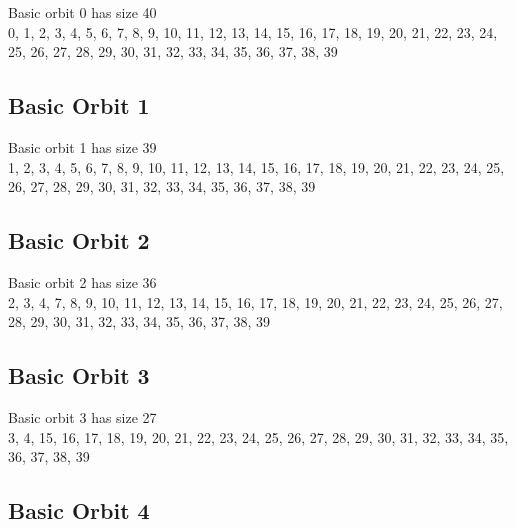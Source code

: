 \documentclass{article}
\begin{document}
{

Basic orbit 0 has size 40\\
0, 1, 2, 3, 4, 5, 6, 7, 8, 9, 10, 11, 12, 13, 14, 15, 16, 17, 18, 19, 20, 21, 22, 23, 24, 25, 26, 27, 28, 29, 30, 31, 32, 33, 34, 35, 36, 37, 38, 39\\
\bigskip

\subsection*{Basic Orbit 1}



Basic orbit 1 has size 39\\
1, 2, 3, 4, 5, 6, 7, 8, 9, 10, 11, 12, 13, 14, 15, 16, 17, 18, 19, 20, 21, 22, 23, 24, 25, 26, 27, 28, 29, 30, 31, 32, 33, 34, 35, 36, 37, 38, 39\\
\bigskip

\subsection*{Basic Orbit 2}



Basic orbit 2 has size 36\\
2, 3, 4, 7, 8, 9, 10, 11, 12, 13, 14, 15, 16, 17, 18, 19, 20, 21, 22, 23, 24, 25, 26, 27, 28, 29, 30, 31, 32, 33, 34, 35, 36, 37, 38, 39\\
\bigskip

\subsection*{Basic Orbit 3}



Basic orbit 3 has size 27\\
3, 4, 15, 16, 17, 18, 19, 20, 21, 22, 23, 24, 25, 26, 27, 28, 29, 30, 31, 32, 33, 34, 35, 36, 37, 38, 39\\
\bigskip

\subsection*{Basic Orbit 4}



}
\end{document}
